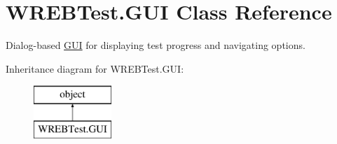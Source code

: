 \hypertarget{class_w_r_e_b_test_1_1_g_u_i}{}\section{W\+R\+E\+B\+Test.\+G\+UI Class Reference}
\label{class_w_r_e_b_test_1_1_g_u_i}


Dialog-\/based \hyperlink{class_w_r_e_b_test_1_1_g_u_i}{G\+UI} for displaying test progress and navigating options.  


Inheritance diagram for W\+R\+E\+B\+Test.\+G\+UI\+:\begin{figure}[H]
\begin{center}
\leavevmode
\includegraphics[height=2.000000cm]{class_w_r_e_b_test_1_1_g_u_i}
\end{center}
\end{figure}
